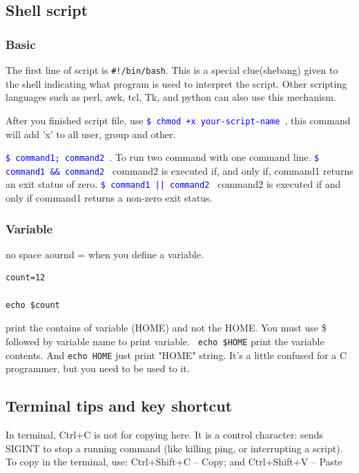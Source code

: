 \documentclass[paper=8.5in:11in, twoside, 12pt, pagesize=pdftex]{book}
\newcommand{\linuxcommand}[1]{\texttt{\textcolor{blue}{\$ #1 \Pisymbol{psy}{191}}}}
\begin{document}
\subsection{Shell script}
\subsubsection{Basic}

	The first line of script is \verb=#!/bin/bash=.  This is a special clue(shebang) given to the shell indicating what program is used to interpret the script. Other scripting languages such as perl, awk, tcl, Tk, and python can also use this mechanism.

	After you finished script file, use \linuxcommand{chmod +x your-script-name}, this command will add 'x' to all user, group and other.
	
	
	\linuxcommand{command1; command2}.   To run two command with one command line.  \linuxcommand{command1 \&\& command2} command2 is executed if, and only if, command1 returns an exit status of zero. \linuxcommand{command1 || command2} command2 is executed if and only if command1 returns a non-zero exit status.

\subsubsection{Variable} 

	no space aournd = when you define a variable.
\begin{lstlisting}
count=12

echo $count
\end{lstlisting}


	
	\par print the contains of variable (HOME) and not the HOME. You must use \$ followed by variable name to print variable. \verb= echo $HOME= print the variable contents. And \verb=echo HOME= just print "HOME" string. It's a little confused for a C programmer, but you need to be used to it. 


\subsection{Terminal tips and key shortcut}

	In terminal, Ctrl+C is not for copying here. It is a control character: sends SIGINT to stop a running command (like killing ping, or interrupting a script). To copy in the terminal, use: Ctrl+Shift+C – Copy; and Ctrl+Shift+V – Paste
\end{document}
